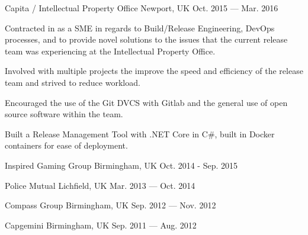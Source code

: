 \begin{cventries}
    {Capita / Intellectual Property Office} %
    {Newport, UK} %
    {Oct. 2015 — Mar. 2016} %
    {
        \begin{cvitems} %
        \item {Contracted in as a SME in regards to Build/Release Engineering, DevOps processes, and to provide novel solutions to the issues that the current release team was experiencing at the Intellectual Property Office.}
        \item {Involved with multiple projects the improve the speed and efficiency of the release team and strived to reduce workload.}
        \item {Encouraged the use of the Git DVCS with Gitlab and the general use of open source software within the team.}
        \item {Built a Release Management Tool with .NET Core in C\#, built in Docker containers for ease of deployment.}
        \end{cvitems}
    }

    
    {Inspired Gaming Group} %
    {Birmingham, UK} %
    {Oct. 2014 - Sep. 2015} %
    {}

    
    {Police Mutual} %
    {Lichfield, UK} %
    {Mar. 2013 — Oct. 2014} %
    {}

    {Compass Group} %
    {Birmingham, UK} %
    {Sep. 2012 — Nov. 2012} %
    {}

    {Capgemini} %
    {Birmingham, UK} %
    {Sep. 2011 — Aug. 2012} %
    {}

\end{cventries}
